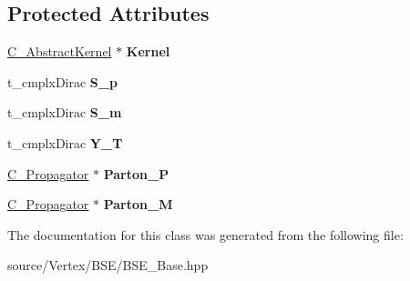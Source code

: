 \subsection*{Protected Attributes}
\begin{DoxyCompactItemize}
\item 
\hypertarget{class_c___b_s_e___base_a80e4c34e7e5a70051f29392af3f0a4d6}{\hyperlink{class_c___abstract_kernel}{C\-\_\-\-Abstract\-Kernel} $\ast$ {\bfseries Kernel}}\label{class_c___b_s_e___base_a80e4c34e7e5a70051f29392af3f0a4d6}

\item 
\hypertarget{class_c___b_s_e___base_a4d3fd8c389600935b97a4e4131663451}{t\-\_\-cmplx\-Dirac {\bfseries S\-\_\-p}}\label{class_c___b_s_e___base_a4d3fd8c389600935b97a4e4131663451}

\item 
\hypertarget{class_c___b_s_e___base_af6aec03e6379d0da807aba163996dbad}{t\-\_\-cmplx\-Dirac {\bfseries S\-\_\-m}}\label{class_c___b_s_e___base_af6aec03e6379d0da807aba163996dbad}

\item 
\hypertarget{class_c___b_s_e___base_a890241f1da07fd911cae4c81554c654e}{t\-\_\-cmplx\-Dirac {\bfseries Y\-\_\-\-T}}\label{class_c___b_s_e___base_a890241f1da07fd911cae4c81554c654e}

\item 
\hypertarget{class_c___b_s_e___base_a3cf8ecfeabef2d1189002b266da65282}{\hyperlink{class_c___propagator}{C\-\_\-\-Propagator} $\ast$ {\bfseries Parton\-\_\-\-P}}\label{class_c___b_s_e___base_a3cf8ecfeabef2d1189002b266da65282}

\item 
\hypertarget{class_c___b_s_e___base_a0a17d7cfe4c2e33736c2854bd5274a96}{\hyperlink{class_c___propagator}{C\-\_\-\-Propagator} $\ast$ {\bfseries Parton\-\_\-\-M}}\label{class_c___b_s_e___base_a0a17d7cfe4c2e33736c2854bd5274a96}

\end{DoxyCompactItemize}


The documentation for this class was generated from the following file\-:\begin{DoxyCompactItemize}
\item 
source/\-Vertex/\-B\-S\-E/B\-S\-E\-\_\-\-Base.\-hpp\end{DoxyCompactItemize}
